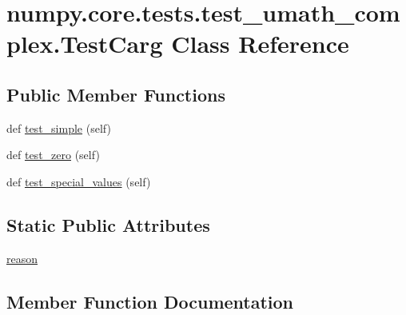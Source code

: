 \hypertarget{classnumpy_1_1core_1_1tests_1_1test__umath__complex_1_1TestCarg}{}\section{numpy.\+core.\+tests.\+test\+\_\+umath\+\_\+complex.\+Test\+Carg Class Reference}
\label{classnumpy_1_1core_1_1tests_1_1test__umath__complex_1_1TestCarg}
\subsection*{Public Member Functions}
\begin{DoxyCompactItemize}
\item 
def \hyperlink{classnumpy_1_1core_1_1tests_1_1test__umath__complex_1_1TestCarg_a5490007c103b8aa2bfb5058d6a3b60e2}{test\+\_\+simple} (self)
\item 
def \hyperlink{classnumpy_1_1core_1_1tests_1_1test__umath__complex_1_1TestCarg_a804a23db923f3ebab9ff07d81e5e2a8a}{test\+\_\+zero} (self)
\item 
def \hyperlink{classnumpy_1_1core_1_1tests_1_1test__umath__complex_1_1TestCarg_a9989da47bf038bf2647069b4114e8530}{test\+\_\+special\+\_\+values} (self)
\end{DoxyCompactItemize}
\subsection*{Static Public Attributes}
\begin{DoxyCompactItemize}
\item 
\hyperlink{classnumpy_1_1core_1_1tests_1_1test__umath__complex_1_1TestCarg_ade1e765c5b82301887fe1bdb80f7a9f8}{reason}
\end{DoxyCompactItemize}


\subsection{Member Function Documentation}
\mbox{\label{classnumpy_1_1core_1_1tests_1_1test__umath__complex_1_1TestCarg_a5490007c103b8aa2bfb5058d6a3b60e2}} 
